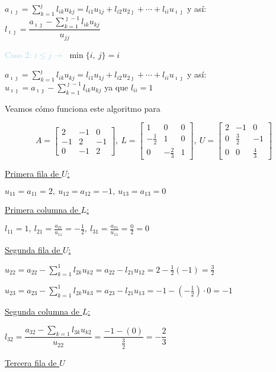 \documentclass[12pt]{article}
\begin{document}
$a_{\imath\jmath  }=\sum_{k=1}^{\jmath}l_{ik}u_{kj}=l_{i1}u_{1j}+l_{i2}u_{2\jmath}+\cdots+l_{ii}u_{\imath\jmath  }$
y así:
$l_{\imath\jmath  }=\dfrac{a_{\imath\jmath  }-\displaystyle\sum_{k=1}^{\jmath-1}l_{ik}u_{kj}}{u_{jj}}$

\textcolor{lightblue}{Caso 2: $i\le j\longrightarrow$}
$\min\{i,~j\}=i$

$a_{\imath\jmath  }=\sum_{k=1}^{\jmath}l_{ik}u_{kj}=l_{i1}u_{1j}+l_{i2}u_{2\jmath}+\cdots+l_{ii}u_{\imath\jmath  }$
y así: $u_{\imath\jmath  }=a_{\imath\jmath  }-\sum_{k=1}^{\jmath-1}l_{ik}u_{kj}$ ya que
$l_{ii}=1$

Veamos cómo funciona este algoritmo para 

\[A=\begin{bmatrix}
2 & -1 & 0 \\ 
-1 & 2 & -1 \\ 
0 & -1 & 2
\end{bmatrix},~L=\begin{bmatrix}
1 & 0 & 0 \\ 
-\frac{1}{2} & 1 & 0 \\ 
0 & -\frac{2}{3} & 1
\end{bmatrix},~U=\begin{bmatrix}
2 & -1 & 0 \\ 
0 & \frac{3}{2} & -1 \\ 
0 & 0 & \frac{4}{3}
\end{bmatrix}\]

\underline{Primera fila de $U$:}

$u_{11}=a_{11}=2,~u_{12}=a_{12}=-1,~u_{13}=a_{13}=0$

\underline{Primera columna de $L$:}

$l_{11}=1,~l_{21}=\frac{a_{21}}{u_{11}}=-\frac{1}{2},~l_{31}=\frac{a_{31}}{u_{11}}=\frac{0}{2}=0$

\underline{Segunda fila de $U$:}

$u_{22}=a_{22}-\sum_{k=1}^{1}l_{2k}u_{k2}=a_{22}-l_{21}u_{12}=2-\frac{1}{2}(-1)=\frac{3}{2}$

$u_{23}=a_{23}-\sum_{k=1}^{1}l_{2k}u_{k3}=a_{23}-l_{21}u_{13}=-1-\left(-\frac{1}{2}\right)\cdot
0=-1$

\underline{Segunda columna de $L$:}

$l_{32}=\dfrac{a_{32}-\displaystyle\sum_{k=1}l_{3k}u_{k2}}{u_{22}}=\dfrac{-1-(0)}{\frac{3}{2}}=-\dfrac{2}{3}$

\underline{Tercera fila de $U$}
\end{document}
